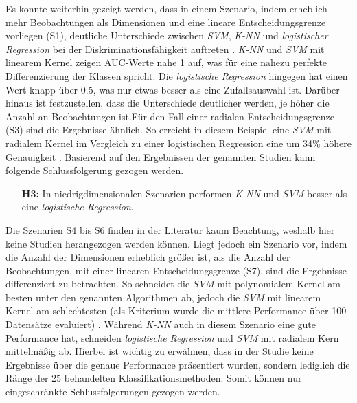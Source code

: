 \documentclass[
]{article}
\begin{document}
Es konnte weiterhin gezeigt werden, dass in einem Szenario, indem
erheblich mehr Beobachtungen als Dimensionen und eine lineare
Entscheidungsgrenze vorliegen (S1), deutliche Unterschiede zwischen
\textit{SVM}, \textit{K-NN} und \textit{logistischer Regression} bei der
Diskriminationsfähigkeit auftreten
\parencite{entezari-malekiComparisonClassificationMethods2009}.
\textit{K-NN} und \textit{SVM} mit linearem Kernel zeigen AUC-Werte nahe
1 auf, was für eine nahezu perfekte Differenzierung der Klassen spricht.
Die \textit{logistische Regression} hingegen hat einen Wert knapp über
0.5, was nur etwas besser als eine Zufallsauswahl ist. Darüber hinaus
ist festzustellen, dass die Unterschiede deutlicher werden, je höher die
Anzahl an Beobachtungen ist.\newline Für den Fall einer radialen
Entscheidungsgrenze (S3) sind die Ergebnisse ähnlich. So erreicht in
diesem Beispiel eine \textit{SVM} mit radialem Kernel im Vergleich zu
einer logistischen Regression eine um 34\% höhere Genauigkeit
\parencite{faveroClassificationPerformanceEvaluation2022}. Basierend auf
den Ergebnissen der genannten Studien kann folgende Schlussfolgerung
gezogen werden.

\begin{minipage}{0.9\linewidth}
\begin{itemize}[leftmargin=0.1\linewidth]
\item[\textbf{H3:}] In niedrigdimensionalen Szenarien performen \textit{K-NN} und \textit{SVM} besser als eine \textit{logistische Regression}.
\end{itemize}
\end{minipage}

Die Szenarien S4 bis S6 finden in der Literatur kaum Beachtung, weshalb
hier keine Studien herangezogen werden können. Liegt jedoch ein Szenario
vor, indem die Anzahl der Dimensionen erheblich größer ist, als die
Anzahl der Beobachtungen, mit einer linearen Entscheidungsgrenze (S7),
sind die Ergebnisse differenziert zu betrachten. So schneidet die
\textit{SVM} mit polynomialem Kernel am besten unter den genannten
Algorithmen ab, jedoch die \textit{SVM} mit linearem Kernel am
schlechtesten (als Kriterium wurde die mittlere Performance über 100
Datensätze evaluiert)
\parencite{scholzComparisonClassificationMethods2021}. Während
\textit{K-NN} auch in diesem Szenario eine gute Performance hat,
schneiden \textit{logistische Regression} und \textit{SVM} mit radialem
Kern mittelmäßig ab. Hierbei ist wichtig zu erwähnen, dass in der Studie
keine Ergebnisse über die genaue Performance präsentiert wurden, sondern
lediglich die Ränge der 25 behandelten Klassifikationsmethoden. Somit
können nur eingeschränkte Schlussfolgerungen gezogen werden.
\end{document}
